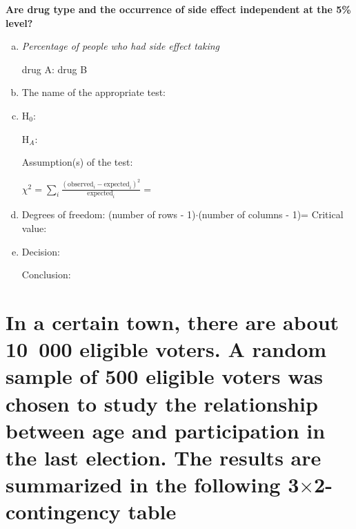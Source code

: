\noindent\textbf{Are drug type and the occurrence of side effect independent at the 5\% level?}

\begin{enumerate}[a)]
\item \textit{Percentage of people who had side effect taking}  

	drug A: \hrulefill \quad
	drug B 	\hrulefill
\item The name of the appropriate test:  \hrulefill
\item H$_0$: \hrulefill 	

 H$_A$: \hrulefill



Assumption(s) of the test: \hrulefill


$
\displaystyle	\chi^2 =\sum_i \frac{(\textrm{observed}_i-\textrm{expected}_i)^2}{\textrm{expected}_i}=
$

\item Degrees of freedom: (number of rows - 1)$\cdot$(number of columns - 1)= \hrulefill\quad	 Critical value: \hrulefill	
\item Decision: 	\hrulefill

	Conclusion: \hrulefill
\end{enumerate}

\section[Voting vs. age]{In a certain town, there are about 10\ 000 eligible voters. A random sample of 500 eligible voters was chosen to study the relationship between age and participation in the last election. The results are summarized in the following 3$\times$2- contingency table}



